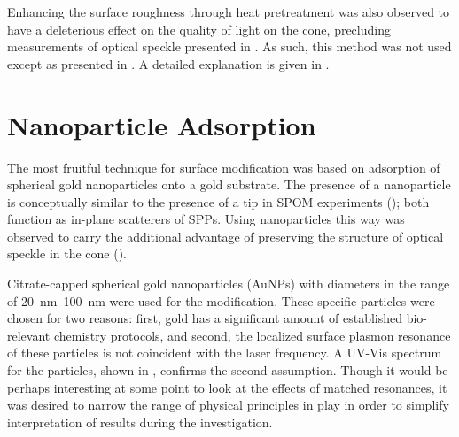 Enhancing the surface roughness through heat pretreatment was also observed to
have a deleterious effect on the quality of light on the cone, precluding
measurements of optical speckle presented in .  As such,
this method was not used except as presented in .  A
detailed explanation is given in .

\section{Nanoparticle Adsorption}
The most fruitful technique for surface modification was based on adsorption
of spherical gold nanoparticles onto a gold substrate.  The presence of a
nanoparticle is conceptually similar to the presence of a tip in SPOM
experiments (); both function as in-plane scatterers of
SPPs.  Using nanoparticles this way was observed to carry the additional
advantage of preserving the structure of optical speckle in the cone
().

Citrate-capped spherical gold nanoparticles (AuNPs) with diameters in the
range of \SIrange{20}{100}{\nano\meter} were used for the modification.  These
specific particles were chosen for two reasons: first, gold has a significant
amount of established bio-relevant chemistry protocols, and second, the
localized surface plasmon resonance of these particles is not coincident with
the laser frequency.  A UV-Vis spectrum for the particles, shown in
, confirms the second assumption.  Though it would be
perhaps interesting at some point to look at the effects of matched
resonances, it was desired to narrow the range of physical principles in play
in order to simplify interpretation of results during the investigation.


